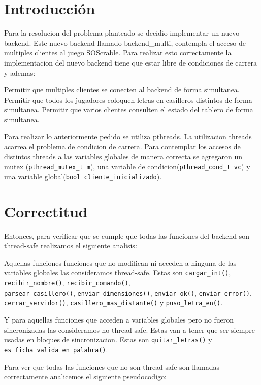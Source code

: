 \section{Introducci\'on}

Para la resolucion del problema planteado se decidio implementar un nuevo backend. Este nuevo backend llamado backend\_multi, contempla el acceso de multiples clientes al juego SOScrable. Para realizar esto correctamente la implementacion del nuevo backend tiene que estar libre de condiciones de carrera y ademas:

Permitir que multiples clientes se conecten al backend de forma simultanea.
Permitir que todos los jugadores coloquen letras en casilleros distintos de forma simultanea.
Permitir que varios clientes consulten el estado del tablero de forma simultanea.

Para realizar lo anteriormente pedido se utiliza pthreads. La utilizacion threads acarrea el problema de condicion de carrera. Para contemplar los accesos de distintos threads a las variables globales de manera correcta se agregaron un mutex (\verb|pthread_mutex_t m|), una variable de condicion(\verb|pthread_cond_t vc|) y una variable global(\verb|bool cliente_inicializado|).

\section{Correctitud}

Entonces, para verificar que se cumple que todas las funciones del backend son thread-safe realizamos el siguiente analisis:

Aquellas funciones funciones que no modifican ni acceden a ninguna de las variables globales las consideramos thread-safe. Estas son \verb|cargar_int()|, \verb|recibir_nombre()|, \verb|recibir_comando()|, \\
\verb|parsear_casillero()|, \verb|enviar_dimensiones()|, \verb|enviar_ok()|, \verb|enviar_error()|, \verb|cerrar_servidor()|, \verb|casillero_mas_distante()| y \verb|puso_letra_en()|.

Y para aquellas funciones que acceden a variables globales pero no fueron sincronizadas las consideramos no thread-safe. Estas van a tener que ser siempre usadas en bloques de sincronizacion. Estas son \verb|quitar_letras()| y \verb|es_ficha_valida_en_palabra()|.

Para ver que todas las funciones que no son thread-safe son llamadas correctamente analicemos el siguiente pseudocodigo:

